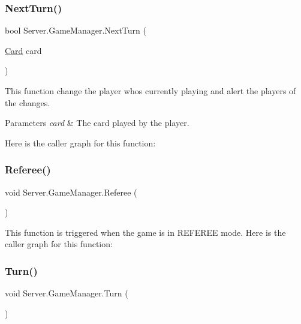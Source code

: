 \subsubsection{\texorpdfstring{Next\+Turn()}{NextTurn()}}
{\footnotesize\ttfamily bool Server.\+Game\+Manager.\+Next\+Turn (\begin{DoxyParamCaption}\item[{\hyperlink{class_game_1_1_card}{Card}}]{card }\end{DoxyParamCaption})\hspace{0.3cm}{\ttfamily [inline]}}

This function change the player who\textquotesingle{}s currently playing and alert the players of the changes. 
\begin{DoxyParams}{Parameters}
{\em card} & The card played by the player. \\
\hline
\end{DoxyParams}
Here is the caller graph for this function\+:
\mbox{\label{class_server_1_1_game_manager_a290183cdbe0ad1767906d5d5c0ac4e54}} 
\subsubsection{\texorpdfstring{Referee()}{Referee()}}
{\footnotesize\ttfamily void Server.\+Game\+Manager.\+Referee (\begin{DoxyParamCaption}{ }\end{DoxyParamCaption})\hspace{0.3cm}{\ttfamily [inline]}}

This function is triggered when the game is in R\+E\+F\+E\+R\+EE mode. Here is the caller graph for this function\+:
\mbox{\label{class_server_1_1_game_manager_afe22c5dc89cdc68d8361540b541acd30}} 
\subsubsection{\texorpdfstring{Turn()}{Turn()}}
{\footnotesize\ttfamily void Server.\+Game\+Manager.\+Turn (\begin{DoxyParamCaption}{ }\end{DoxyParamCaption})\hspace{0.3cm}{\ttfamily [inline]}}

